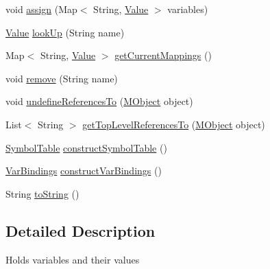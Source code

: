 \begin{DoxyCompactItemize}
\item 
void \hyperlink{classorg_1_1tzi_1_1use_1_1util_1_1soil_1_1_variable_environment_afb73990da05b803410b568fe23d65b1b}{assign} (Map$<$ String, \hyperlink{classorg_1_1tzi_1_1use_1_1uml_1_1ocl_1_1value_1_1_value}{Value} $>$ variables)
\item 
\hyperlink{classorg_1_1tzi_1_1use_1_1uml_1_1ocl_1_1value_1_1_value}{Value} \hyperlink{classorg_1_1tzi_1_1use_1_1util_1_1soil_1_1_variable_environment_ab98aaa94eb1aef304a56af66a20ca590}{look\-Up} (String name)
\item 
Map$<$ String, \hyperlink{classorg_1_1tzi_1_1use_1_1uml_1_1ocl_1_1value_1_1_value}{Value} $>$ \hyperlink{classorg_1_1tzi_1_1use_1_1util_1_1soil_1_1_variable_environment_a6082a995cfe83a7a6ea228391a0f89d8}{get\-Current\-Mappings} ()
\item 
void \hyperlink{classorg_1_1tzi_1_1use_1_1util_1_1soil_1_1_variable_environment_ab2fb18b7900ce44ba7cfd3ef54fb0a9d}{remove} (String name)
\item 
void \hyperlink{classorg_1_1tzi_1_1use_1_1util_1_1soil_1_1_variable_environment_aba7b54ae10f88c4c1cef934558e49e50}{undefine\-References\-To} (\hyperlink{interfaceorg_1_1tzi_1_1use_1_1uml_1_1sys_1_1_m_object}{M\-Object} object)
\item 
List$<$ String $>$ \hyperlink{classorg_1_1tzi_1_1use_1_1util_1_1soil_1_1_variable_environment_adc8a16cee64a993e2881528e1f590d43}{get\-Top\-Level\-References\-To} (\hyperlink{interfaceorg_1_1tzi_1_1use_1_1uml_1_1sys_1_1_m_object}{M\-Object} object)
\item 
\hyperlink{classorg_1_1tzi_1_1use_1_1util_1_1soil_1_1_symbol_table}{Symbol\-Table} \hyperlink{classorg_1_1tzi_1_1use_1_1util_1_1soil_1_1_variable_environment_a4f7bd31dfa5e8b1a9780d2ed6a29c0cb}{construct\-Symbol\-Table} ()
\item 
\hyperlink{classorg_1_1tzi_1_1use_1_1uml_1_1ocl_1_1value_1_1_var_bindings}{Var\-Bindings} \hyperlink{classorg_1_1tzi_1_1use_1_1util_1_1soil_1_1_variable_environment_afee62f67ac198ec7570c6f54d5b3af11}{construct\-Var\-Bindings} ()
\item 
String \hyperlink{classorg_1_1tzi_1_1use_1_1util_1_1soil_1_1_variable_environment_a559f626a58b6dbaa95192a0e5e434b66}{to\-String} ()
\end{DoxyCompactItemize}


\subsection{Detailed Description}
Holds variables and their values 

